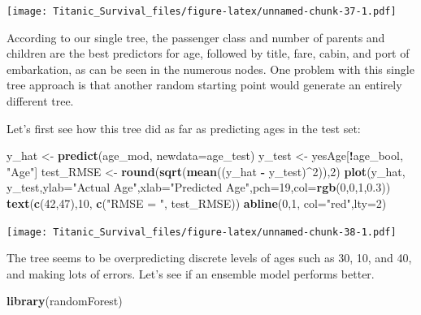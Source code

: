 \documentclass[]{article}
\newenvironment{Shaded}{\begin{snugshade}}{\end{snugshade}}
\newcommand{\KeywordTok}[1]{\textcolor[rgb]{0.13,0.29,0.53}{\textbf{#1}}}
\newcommand{\DataTypeTok}[1]{\textcolor[rgb]{0.13,0.29,0.53}{#1}}
\newcommand{\DecValTok}[1]{\textcolor[rgb]{0.00,0.00,0.81}{#1}}
\newcommand{\FloatTok}[1]{\textcolor[rgb]{0.00,0.00,0.81}{#1}}
\newcommand{\StringTok}[1]{\textcolor[rgb]{0.31,0.60,0.02}{#1}}
\newcommand{\OperatorTok}[1]{\textcolor[rgb]{0.81,0.36,0.00}{\textbf{#1}}}
\newcommand{\NormalTok}[1]{#1}
\begin{document}
\texttt{[image: Titanic\_Survival\_files/figure-latex/unnamed-chunk-37-1.pdf]}

According to our single tree, the passenger class and number of parents
and children are the best predictors for age, followed by title, fare,
cabin, and port of embarkation, as can be seen in the numerous nodes.
One problem with this single tree approach is that another random
starting point would generate an entirely different tree.

Let's first see how this tree did as far as predicting ages in the test
set:

\begin{Shaded}
\begin{Highlighting}[]
\NormalTok{y_hat <-}\StringTok{ }\KeywordTok{predict}\NormalTok{(age_mod, }\DataTypeTok{newdata=}\NormalTok{age_test)}
\NormalTok{y_test <-}\StringTok{ }\NormalTok{yesAge[}\OperatorTok{!}\NormalTok{age_bool, }\StringTok{"Age"}\NormalTok{]}
\NormalTok{test_RMSE <-}\StringTok{ }\KeywordTok{round}\NormalTok{(}\KeywordTok{sqrt}\NormalTok{(}\KeywordTok{mean}\NormalTok{((y_hat }\OperatorTok{-}\StringTok{ }\NormalTok{y_test)}\OperatorTok{^}\DecValTok{2}\NormalTok{)),}\DecValTok{2}\NormalTok{)}
\KeywordTok{plot}\NormalTok{(y_hat, y_test,}\DataTypeTok{ylab=}\StringTok{"Actual Age"}\NormalTok{,}\DataTypeTok{xlab=}\StringTok{"Predicted Age"}\NormalTok{,}\DataTypeTok{pch=}\DecValTok{19}\NormalTok{,}\DataTypeTok{col=}\KeywordTok{rgb}\NormalTok{(}\DecValTok{0}\NormalTok{,}\DecValTok{0}\NormalTok{,}\DecValTok{1}\NormalTok{,}\FloatTok{0.3}\NormalTok{))}
\KeywordTok{text}\NormalTok{(}\KeywordTok{c}\NormalTok{(}\DecValTok{42}\NormalTok{,}\DecValTok{47}\NormalTok{),}\DecValTok{10}\NormalTok{, }\KeywordTok{c}\NormalTok{(}\StringTok{"RMSE = "}\NormalTok{, test_RMSE))}
\KeywordTok{abline}\NormalTok{(}\DecValTok{0}\NormalTok{,}\DecValTok{1}\NormalTok{, }\DataTypeTok{col=}\StringTok{"red"}\NormalTok{,}\DataTypeTok{lty=}\DecValTok{2}\NormalTok{)}
\end{Highlighting}
\end{Shaded}

\texttt{[image: Titanic\_Survival\_files/figure-latex/unnamed-chunk-38-1.pdf]}

The tree seems to be overpredicting discrete levels of ages such as 30,
10, and 40, and making lots of errors. Let's see if an ensemble model
performs better.

\begin{Shaded}
\begin{Highlighting}[]
\KeywordTok{library}\NormalTok{(randomForest)}
\end{Highlighting}
\end{Shaded}
\end{document}
